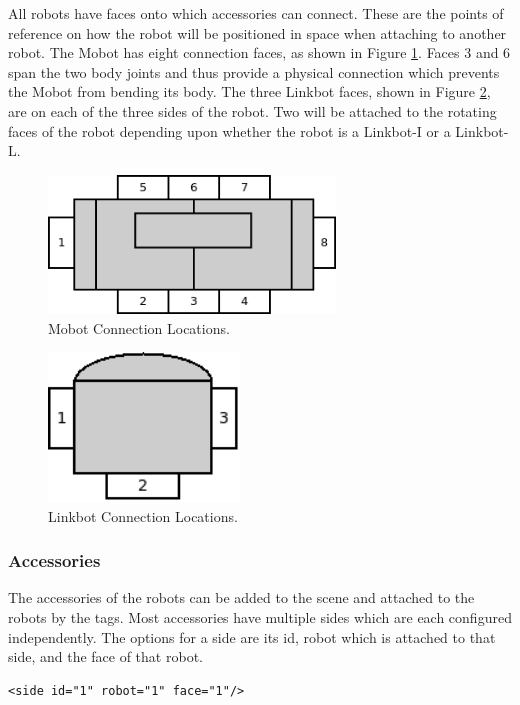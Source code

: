 \documentclass{article}
\begin{document}
All robots have faces onto which accessories can connect.  These are the points
of reference on how the robot will be positioned in space when attaching to
another robot.  The Mobot has eight connection faces, as shown in Figure
\ref{fig:mobot_connections}.  Faces 3 and 6 span the two body joints and thus
provide a physical connection which prevents the Mobot from bending its body.
The three Linkbot faces, shown in Figure \ref{fig:linkbot_connections}, are on
each of the three sides of the robot.  Two will be attached to the rotating
faces of the robot depending upon whether the robot is a Linkbot-I or a
Linkbot-L.
\begin{figure}[H]
	\begin{center}
		\includegraphics[width=3in]{pictures/mobot_connections}
	\end{center}
	\caption{Mobot Connection Locations.}
	\label{fig:mobot_connections}
\end{figure}
\begin{figure}[H]
	\begin{center}
		\includegraphics[width=2in]{pictures/linkbot_connections}
	\end{center}
	\caption{Linkbot Connection Locations.}
	\label{fig:linkbot_connections}
\end{figure}

\subsubsection{Accessories}
The accessories of the robots can be added to the scene and attached to the
robots by the tags.  Most accessories have multiple sides which are each
configured independently.  The options for a side are its id, robot which is
attached to that side, and the face of that robot.
\begin{verbatim}
<side id="1" robot="1" face="1"/>
\end{verbatim}
\end{document}
